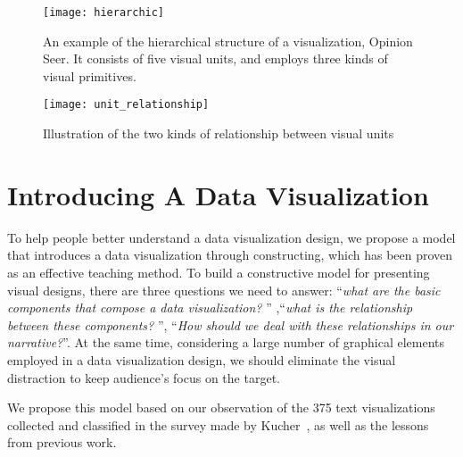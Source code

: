 \begin{figure*}
 \centering %
 \texttt{[image: hierarchic]}
 \caption{An example of the hierarchical structure of a visualization, Opinion Seer\cite{wu_opinionseer:_2010}. It consists of five visual units, and employs three kinds of visual primitives. }
 \label{fig:hierarchic}
\end{figure*}

\begin{figure}[tb]
 \centering %
 \texttt{[image: unit\_relationship]}
 \caption{Illustration of the two kinds of relationship between visual units}
 \label{fig:unit_relationship}
\end{figure}

\section{Introducing A Data Visualization} \label{analysis}

To help people better understand a data visualization design, we propose a model that introduces a data visualization through constructing, which has been proven as an effective teaching method\cite{huron_constructive_2014, chapman_constructive_1988}. To build a constructive model for presenting visual designs, there are three questions we need to answer: ``\textit{what are the basic components that compose a data visualization? }'' ,``\textit{what is the relationship between these components? }'', ``\textit{How should we deal with these relationships in our narrative?}''. At the same time, considering a large number of graphical elements employed in a data visualization design, we should eliminate the visual distraction to keep audience's focus on the target.

We propose this model based on our observation of the 375 text visualizations collected and classified in the survey made by Kucher~\cite{kucher2015text}, as well as the lessons from previous work. 


